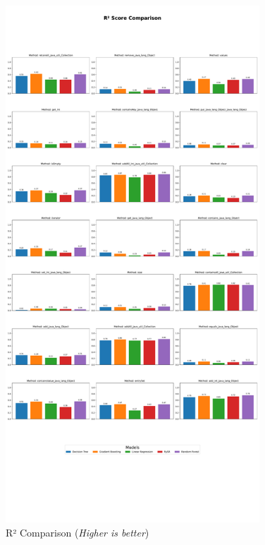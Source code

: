 \begin{figure}[htbp]
  \centering
  \includegraphics[width=0.85\textwidth]{figures/r2_comparison.pdf}
  \caption{R² Comparison (\textit{Higher is better})}
  \label{fig:r2_comparison}
\end{figure}




